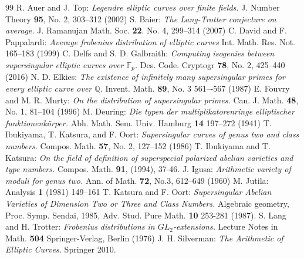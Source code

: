 \documentclass[10pt,a4paper]{amsart}
\theoremstyle{plain}
\newcommand{\fp}{\mathbb{F}_p}
\begin{document}
\begin{thebibliography}{99}
 R. Auer and J. Top: \textit{Legendre elliptic curves over finite fields.} J. Number Theory {\bf 95}, No. 2, 303--312 (2002)
 S. Baier: \textit{The Lang-Trotter conjecture on average.} J. Ramanujan Math. Soc. {\bf 22}. No. 4, 299--314 (2007)
 C. David and F. Pappalardi: \textit{Average frobenius distribution of elliptic curves} Int. Math. Res. Not. 165--183 (1999)
 C. Delfs and S. D. Galbraith: \textit{Computing isogenies between supersingular elliptic curves over $\fp$.} Des. Code. Cryptogr {\bf 78}, No. 2, 425--440 (2016)
 N. D. Elkies: \textit{The existence of infinitely many supersingular primes for every elliptic curve over $\mathbb Q$.} Invent. Math. {\bf 89}, No. 3 561--\mbox{-}567 (1987)
 E. Fouvry and M. R. Murty: \textit{On the distribution of supersingular primes.} Can. J. Math. {\bf 48}, No. 1, 81--104 (1996)
 M. Deuring: \textit{Die typen der multiplikatorenringe elliptischer funktionenk\"{o}rper.} Abh. Math. Sem. Univ. Hamburg {\bf 14} 197--272 (1941)
 T. Ibukiyama, T. Katsura, and F. Oort: \textit{Supersingular curves of genus two and class numbers.} Compos. Math. {\bf 57}, No. 2, 127--152 (1986)
 T. Ibukiyama and T. Katsura: \textit{On the field of definition of superspecial polarized abelian varieties and type numbers.} Compos. Math. {\bf 91}, (1994), 37-46.
 J. Igusa: \textit{Arithmetic variety of moduli for genus two.} Ann. of Math. {\bf 72}, No.3, 612--649 (1960)
 M. Jutila:  Analysis {\bf 1} (1981) 149--161
 T. Katsura and F. Oort: \textit{Supersingular Abelian Varieties of Dimension Two or Three and Class Numbers.} Algebraic geometry, Proc. Symp. Sendai, 1985, Adv. Stud. Pure Math. {\bf 10} 253-281 (1987).
 S. Lang and H. Trotter: \textit{Frobenius distributions in ${GL}_2$-extensions.} Lecture Notes in Math. {\bf 504} Springer-Verlag, Berlin (1976)
 J. H. Silverman: \textit{The Arithmetic of Elliptic Curves.} Springer 2010.
\end{thebibliography}
\end{document}
